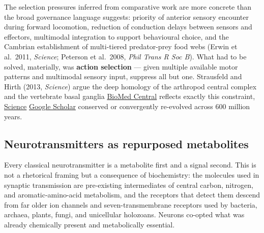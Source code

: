 The selection pressures inferred from comparative work are more concrete than the broad governance language suggests: priority of anterior sensory encounter during forward locomotion, reduction of conduction delays between sensors and effectors, multimodal integration to support behavioural choice, and the Cambrian establishment of multi-tiered predator-prey food webs (Erwin et al.~2011, \emph{Science}; Peterson et al.~2008, \emph{Phil Trans R Soc B}). What had to be solved, materially, was \textbf{action selection} --- given multiple available motor patterns and multimodal sensory input, suppress all but one. Strausfeld and Hirth (2013, \emph{Science}) argue the deep homology of the arthropod central complex and the vertebrate basal ganglia \href{https://evodevojournal.biomedcentral.com/articles/10.1186/2041-9139-4-27}{BioMed Central} reflects exactly this constraint, \href{https://www.science.org/doi/abs/10.1126/science.1231828}{Science} \href{https://scholar.google.com/scholar_lookup?title=Deep+homology+of+arthropod+central+complex+and+vertebrate+basal+ganglia&amp=&author=N.+J.+Strausfeld&amp=&author=F.+Hirth&amp=&publication_year=2013&amp=&journal=Science&amp=&pages=157-161&amp=&doi=10.1126/science.1231828&amp=&pmid=23580521}{Google Scholar} conserved or convergently re-evolved across 600 million years.

\subsection{Neurotransmitters as repurposed metabolites}\label{04_urbilateria-neurotransmitters-as-repurposed-metabolites}

Every classical neurotransmitter is a metabolite first and a signal second. This is not a rhetorical framing but a consequence of biochemistry: the molecules used in synaptic transmission are pre-existing intermediates of central carbon, nitrogen, and aromatic-amino-acid metabolism, and the receptors that detect them descend from far older ion channels and seven-transmembrane receptors used by bacteria, archaea, plants, fungi, and unicellular holozoans. Neurons co-opted what was already chemically present and metabolically essential.

